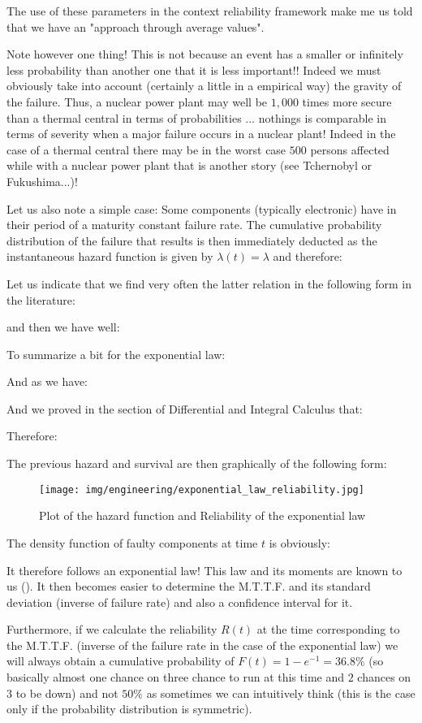 		The use of these parameters in the context reliability framework make me us told that we have an "approach through average values".
		
		Note however one thing! This is not because an event has a smaller or infinitely less probability than another one that it is less important!! Indeed we must obviously take into account (certainly a little in a empirical way) the gravity of the failure. Thus, a nuclear power plant may well be $1,000$ times more secure than a thermal central in terms of probabilities ... nothings is comparable in terms of severity when a major failure occurs in a nuclear plant! Indeed in the case of a thermal central there may be in the worst case $500$ persons affected while with a nuclear power plant that is another story (see Tchernobyl or Fukushima...)!
		
		Let us also note a simple case: Some components (typically electronic) have in their period of a maturity constant failure rate. The cumulative probability distribution of the failure that results is then immediately deducted as the instantaneous hazard function is given by $\lambda(t)=\lambda$ and therefore:
	
	Let us indicate that we find very often the latter relation in the following form in the literature:
	
	and then we have well:
	
	To summarize a bit for the exponential law:
	
	And as we have:
	
	And we proved in the section of Differential and Integral Calculus that:
	
	Therefore:
	
	The previous hazard and survival are then graphically of the following form:
	\begin{figure}[H]
		\centering
		\texttt{[image: img/engineering/exponential\_law\_reliability.jpg]}
		\caption{Plot of the hazard function and Reliability of the exponential law}
	\end{figure}	
	The density function of faulty components at time $t$ is obviously:
	
	It therefore follows an exponential law! This law and its moments are known to us (). It then becomes easier to determine the M.T.T.F. and its standard deviation (inverse of failure rate) and also a confidence interval for it.
	
	Furthermore, if we calculate the reliability $R(t)$ at the time corresponding to the M.T.T.F. (inverse of the failure rate in the case of the exponential law) we will always obtain a cumulative probability of $F(t)=1-e^{-1}=36.8\%$ (so basically almost one chance on three chance to run at this time and $2$ chances on $3$ to be down) and not $50\%$ as sometimes we can intuitively think (this is the case only if the probability distribution is symmetric).
	
